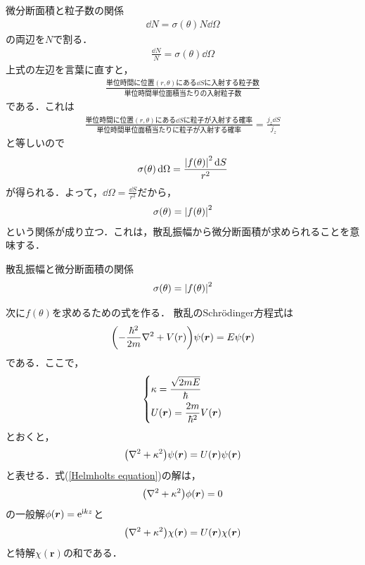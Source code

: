 \documentclass{report}
\begin{document}
  微分断面積と粒子数の関係
  \begin{align}
    \dd{N} = \sigma (\theta) N \dd{\Omega}
  \end{align}
  の両辺を$N$で割る．
  \begin{align}
    \frac{\dd{N}}{N} = \sigma (\theta) \dd{\Omega}
  \end{align}
  上式の左辺を言葉に直すと，
  \begin{align}
    \frac{\text{単位時間に位置$(r,\theta)$にある$\dd{S}$に入射する粒子数}}{\text{単位時間単位面積当たりの入射粒子数}}
  \end{align}
  である．これは
  \begin{align}
    \frac{\text{単位時間に位置$(r,\theta)$にある$\dd{S}$に粒子が入射する確率}}{\text{単位時間単位面積当たりに粒子が入射する確率}} = \frac{j_z \dd{S}}{j_z}
  \end{align}
  と等しいので
  \begin{align}
    \sigma(\theta)\dd{\Omega} = \frac{\abs{f(\theta)}^2\dd{S}}{r^2}
  \end{align}
  が得られる．よって，$\dd{\Omega} = \frac{\dd{S}}{r^2}$だから，
  \begin{align}
    \sigma(\theta) = \abs{f(\theta)}^2
  \end{align}
  という関係が成り立つ．これは，散乱振幅から微分断面積が求められることを意味する．
  \begin{itembox}[l]{散乱振幅と微分断面積の関係}
    \begin{equation}
      \sigma(\theta) = \abs{f(\theta)}^2
    \end{equation}
  \end{itembox}

  次に$f(\theta)$を求めるための式を作る．
  散乱のSchrödinger方程式は
  \begin{align}
    \qty(-\frac{\hbar^2}{2m}\nabla^2 + V(r))\psi(\bm{r}) = E\psi(\bm{r})
  \end{align}
  である．ここで，
  \begin{align}
    \begin{dcases}
      \kappa = \frac{\sqrt{2mE}}{\hbar}\\
      U(\bm{r}) = \frac{2m}{\hbar^2} V(\bm{r})
    \end{dcases}
  \end{align}
  とおくと，
  \begin{align}
    \label{Helmholtz equation}
    \qty(\nabla^2 + \kappa^2)\psi(\bm{r}) = U(\bm{r}) \psi(\bm{r})
  \end{align}
  と表せる．式(\ref{Helmholts equation})の解は，
  \begin{align}
    \qty(\nabla^2 + \kappa^2)\phi(\bm{r}) = 0
  \end{align}
  の一般解$\phi(\bm{r}) = \mathrm{e}^{\mathrm{i} k z}$と
  \begin{align}
    \label{Tokkai}
    \qty(\nabla^2 + \kappa^2)\chi(\bm{r}) = U(\bm{r}) \chi(\bm{r})
  \end{align}
  と特解$\chi(\bm{r})$の和である．
  
\end{document}
